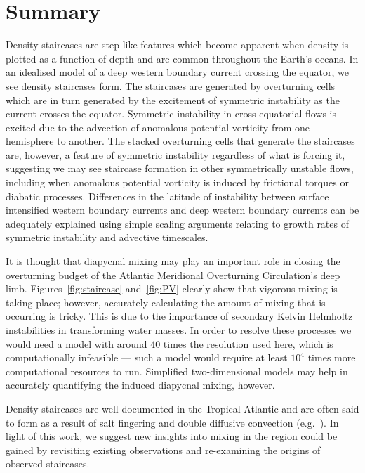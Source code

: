 \section{Summary}
\label{sec:conc}
Density staircases are step-like features which become apparent when density is plotted as a function of depth and are common throughout the Earth's oceans. In an idealised model of a deep western boundary current crossing the equator, we see density staircases form. The staircases are generated by overturning cells which are in turn generated by the excitement of symmetric instability as the current crosses the equator. Symmetric instability in cross-equatorial flows is excited due to the advection of anomalous potential vorticity from one hemisphere to another. The stacked overturning cells that generate the staircases are, however, a feature of symmetric instability regardless of what is forcing it, suggesting we may see staircase formation in other symmetrically unstable flows, including when anomalous potential vorticity is induced by frictional torques or diabatic processes. Differences in the latitude of instability between surface intensified western boundary currents and deep western boundary currents can be adequately explained using simple scaling arguments relating to growth rates of symmetric instability and advective timescales.

It is thought that diapycnal mixing may play an important role in closing the overturning budget of the Atlantic Meridional Overturning Circulation's deep limb. Figures~\ref{fig:staircase} and~\ref{fig:PV} clearly show that vigorous mixing is taking place; however, accurately calculating the amount of mixing that is occurring is tricky. This is due to the importance of secondary Kelvin Helmholtz instabilities in transforming water masses. In order to resolve these processes we would need a model with around 40 times the resolution used here, which is computationally infeasible --- such a model would require at least $10^4$ times more computational resources to run. Simplified two-dimensional models may help in accurately quantifying the induced diapycnal mixing, however.

Density staircases are well documented in the Tropical Atlantic and are often said to form as a result of salt fingering and double diffusive convection (e.g.~\citet{Schmitt1987, Schmitt2005}). In light of this work, we suggest new insights into mixing in the region could be gained by revisiting existing observations and re-examining the origins of observed staircases.
